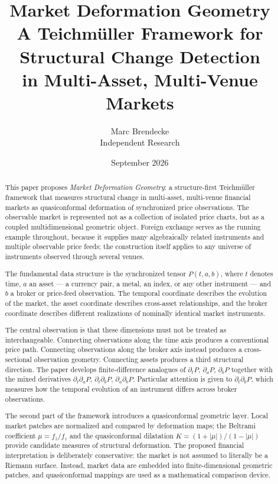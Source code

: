 \documentclass[11pt,a4paper]{article}
\title{
\textbf{Market Deformation Geometry}
\\[0.5em]
\large
A Teichmüller Framework for Structural Change Detection\\
in Multi-Asset, Multi-Venue Markets
}
\author{Marc Brendecke\\[0.15em]\small Independent Research}
\date{September 2026}
\numberwithin{equation}{section}
\newcommand{\abs}[1]{\left|#1\right|}
\begin{document}
\maketitle

\begin{abstract}
This paper proposes \emph{Market Deformation Geometry}: a
structure-first Teichmüller framework that measures structural
change in multi-asset, multi-venue financial markets as
quasiconformal deformation of synchronized price observations. The
observable market is represented not as a collection of isolated
price charts, but as a coupled multidimensional geometric object.
Foreign exchange serves
as the running example throughout, because it supplies many
algebraically related instruments and multiple observable price
feeds; the construction itself applies to any universe of
instruments observed through several venues.

The fundamental data structure is the synchronized tensor
$P(t,a,b)$, where $t$ denotes time, $a$ an asset --- a currency
pair, a metal, an index, or any other instrument --- and $b$ a
broker or price-feed observation. The temporal coordinate describes
the evolution of the market, the asset coordinate describes
cross-asset relationships, and the broker coordinate describes
different realizations of nominally identical market instruments.

The central observation is that these dimensions must not be treated
as interchangeable. Connecting observations along the time axis
produces a conventional price path. Connecting observations along
the broker axis instead produces a cross-sectional observation
geometry. Connecting assets produces a third structural direction.
The paper develops finite-difference analogues of
$\partial_tP$, $\partial_aP$, $\partial_bP$ together with the mixed
derivatives $\partial_t\partial_aP$, $\partial_t\partial_bP$,
$\partial_a\partial_bP$. Particular attention is given to
$\partial_t\partial_bP$, which measures how the temporal evolution
of an instrument differs across broker observations.

The second part of the framework introduces a quasiconformal
geometric layer. Local market patches are normalized and compared by
deformation maps; the Beltrami coefficient
$\mu=f_{\bar z}/f_z$ and the quasiconformal dilatation
$K=(1+\abs{\mu})/(1-\abs{\mu})$ provide candidate measures of
structural deformation. The proposed financial interpretation is
deliberately conservative: the market is not assumed to literally be
a Riemann surface. Instead, market data are embedded into
finite-dimensional geometric patches, and quasiconformal mappings
are used as a mathematical comparison device.


\end{abstract}
\end{document}
